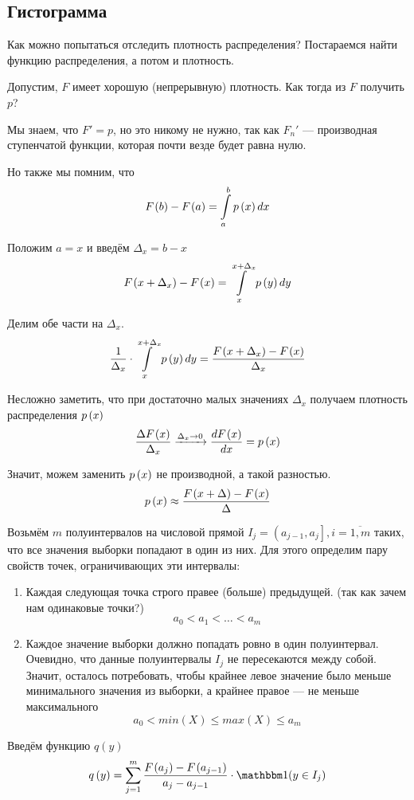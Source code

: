 \subsection{Гистограмма}
Как можно попытаться отследить плотность распределения?
Постараемся найти функцию распределения, а потом и плотность.

Допустим, $F$ имеет хорошую (непрерывную) плотность.
Как тогда из $F$ получить $p$?

Мы знаем, что $F'=p$, но это никому не нужно, так как $F_n'$ --- производная
ступенчатой функции, которая почти везде будет равна нулю.

Но также мы помним, что
$$F_{}\left(b\right)-F_{}\left(a\right)=\int\limits_a^b p\left(x\right) dx$$

Положим $a=x$ и введём $\Delta_x=b-x$
$$F_{}\left(x+\Delta_x\right)-F_{}\left(x\right)=\int\limits_x^{x+\Delta_x} p\left(y\right) dy$$

Делим обе части на $\Delta_x$.
$$\frac{1}{\Delta_x}\cdot\int\limits_x^{x+\Delta_x} p\left(y\right) dy
=\frac{F_{}\left(x+\Delta_x\right)-F_{}\left(x\right)}{\Delta_x}$$

Несложно заметить,
что при достаточно малых значениях $\Delta_x$
получаем плотность распределения $p\left(x\right)$
$$\frac{\Delta F_{}\left(x\right)}{\Delta_x}
\xrightarrow[]{\Delta_x\to 0}
\frac{dF_{}\left(x\right)}{dx}=p\left(x\right)$$

Значит, можем заменить $p\left(x\right)$ не производной, а такой разностью.
$$p\left(x\right)\approx\frac{F_{}\left(x+\Delta\right)-F_{}\left(x\right)}{\Delta}$$

Возьмём $m$ полуинтервалов на числовой прямой
$I_j=\left(a_{j-1},a_j\right], i=\overline{1,m}$
таких, что все значения выборки попадают в один из них.
Для этого определим пару свойств точек, ограничивающих эти интервалы:
\begin{enumerate}
    \item Каждая следующая точка строго правее (больше) предыдущей.
        (так как зачем нам одинаковые точки?)
        $$a_0<a_1<\dots<a_m$$
    \item Каждое значение выборки должно попадать ровно в один полуинтервал.
        Очевидно, что данные полуинтервалы $I_j$ не пересекаются между собой.
        Значит, осталось потребовать, чтобы
        крайнее левое значение было меньше минимального значения из выборки,
        а крайнее правое --- не меньше максимального
        $$a_0<min\left(X\right)\le max\left(X\right)\le a_m$$
\end{enumerate}

Введём функцию $q\left(y\right)$
$$q\left(y\right)
=\sum_{j=1}^m \frac{\cdf{a_j}-\cdf{a_{j-1}}}{a_j-a_{j-1}}
    \cdot\indicator{y\in I_j}$$

